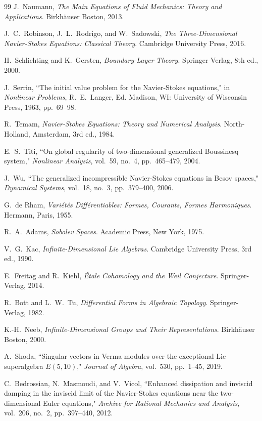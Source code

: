 \documentclass[reqno,10pt]{amsart}
\theoremstyle{plain}
\theoremstyle{definition}
\begin{document}
\begin{thebibliography}{99}
J.~Naumann,
\textit{The Main Equations of Fluid Mechanics: Theory and Applications}.
Birkhäuser Boston, 2013.

J.~C.~Robinson, J.~L.~Rodrigo, and W.~Sadowski,
\textit{The Three-Dimensional Navier-Stokes Equations: Classical Theory}.
Cambridge University Press, 2016.

H.~Schlichting and K.~Gersten,
\textit{Boundary-Layer Theory}.
Springer-Verlag, 8th ed., 2000.

J.~Serrin,
``The initial value problem for the Navier-Stokes equations,"
in \textit{Nonlinear Problems},
R.~E.~Langer, Ed. Madison, WI: University of Wisconsin Press, 1963, pp.~69--98.

R.~Temam,
\textit{Navier-Stokes Equations: Theory and Numerical Analysis}.
North-Holland, Amsterdam, 3rd ed., 1984.

E.~S.~Titi,
``On global regularity of two-dimensional generalized Boussinesq system,"
\textit{Nonlinear Analysis}, vol.~59, no.~4, pp.~465--479, 2004.

J.~Wu,
``The generalized incompressible Navier-Stokes equations in Besov spaces,"
\textit{Dynamical Systems}, vol.~18, no.~3, pp.~379--400, 2006.

G.~de Rham,
\textit{Variétés Différentiables: Formes, Courants, Formes Harmoniques}.
Hermann, Paris, 1955.

R.~A.~Adams,
\textit{Sobolev Spaces}.
Academic Press, New York, 1975.

V.~G.~Kac,
\textit{Infinite-Dimensional Lie Algebras}.
Cambridge University Press, 3rd ed., 1990.

E.~Freitag and R.~Kiehl,
\textit{Étale Cohomology and the Weil Conjecture}.
Springer-Verlag, 2014.

R.~Bott and L.~W.~Tu,
\textit{Differential Forms in Algebraic Topology}.
Springer-Verlag, 1982.

K.-H.~Neeb,
\textit{Infinite-Dimensional Groups and Their Representations}.
Birkhäuser Boston, 2000.

A.~Shoda,
``Singular vectors in Verma modules over the exceptional Lie superalgebra $E(5,10)$,"
\textit{Journal of Algebra}, vol.~530, pp.~1--45, 2019.

C.~Bedrossian, N.~Masmoudi, and V.~Vicol,
``Enhanced dissipation and inviscid damping in the inviscid limit of the Navier-Stokes equations near the two-dimensional Euler equations,"
\textit{Archive for Rational Mechanics and Analysis}, vol.~206, no.~2, pp.~397--440, 2012.


\end{thebibliography}
\end{document}
